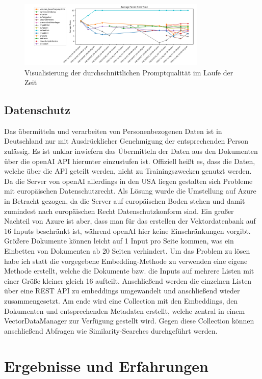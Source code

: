 \begin{figure}[ht]
    \centering
    \includegraphics[width=0.8\textwidth]{figures/03_Prompt_Evaluierung.png}
    \caption{Visualisierung der durchschnittlichen Promptqualität im Laufe der Zeit}
    \label{fig:03_Prompt_Evaluierung}    %
    \end{figure}

\subsection{Datenschutz}
Das übermitteln und verarbeiten von Personenbezogenen Daten ist in Deutschland nur mit Ausdrücklicher Genehmigung der 
entsprechenden Person zulässig. Es ist unklar inwiefern das Übermitteln der Daten aus den Dokumenten über die openAI 
API hierunter einzustufen ist. Offiziell heißt es, dass die Daten, welche über die API geteilt werden, nicht zu 
Trainingszwecken genutzt werden. Da die Server von openAI allerdings in den USA liegen gestalten sich Probleme mit 
europäischen Datenschutzrecht. Als Lösung wurde die Umstellung auf Azure in Betracht gezogen, da die Server auf europäischen 
Boden stehen und damit zumindest nach europäischen Recht Datenschutzkonform sind. Ein großer Nachteil von Azure ist aber, 
dass man für das erstellen der Vektordatenbank auf 16 Inputs beschränkt ist, während openAI hier keine Einschränkungen vorgibt. 
Größere Dokumente können leicht auf 1 Input pro Seite kommen, was ein Einbetten von Dokumenten ab 20 Seiten verhindert.
Um das Problem zu lösen habe ich statt die vorgegebene Embedding-Methode zu verwenden eine eigene Methode erstellt, 
welche die Dokumente bzw. die Inputs auf mehrere Listen mit einer Größe kleiner gleich 16 aufteilt. Anschließend werden 
die einzelnen Listen über eine REST API zu embeddings umgewandelt und anschließend wieder zusammengesetzt. Am ende wird eine 
Collection mit den Embeddings, den Dokumenten und entsprechenden Metadaten erstellt, welche zentral in einem VectorDataManager 
zur Verfügung gestellt wird. Gegen diese Collection können anschließend Abfragen wie Similarity-Searches durchgeführt werden.

\section{Ergebnisse und Erfahrungen}
